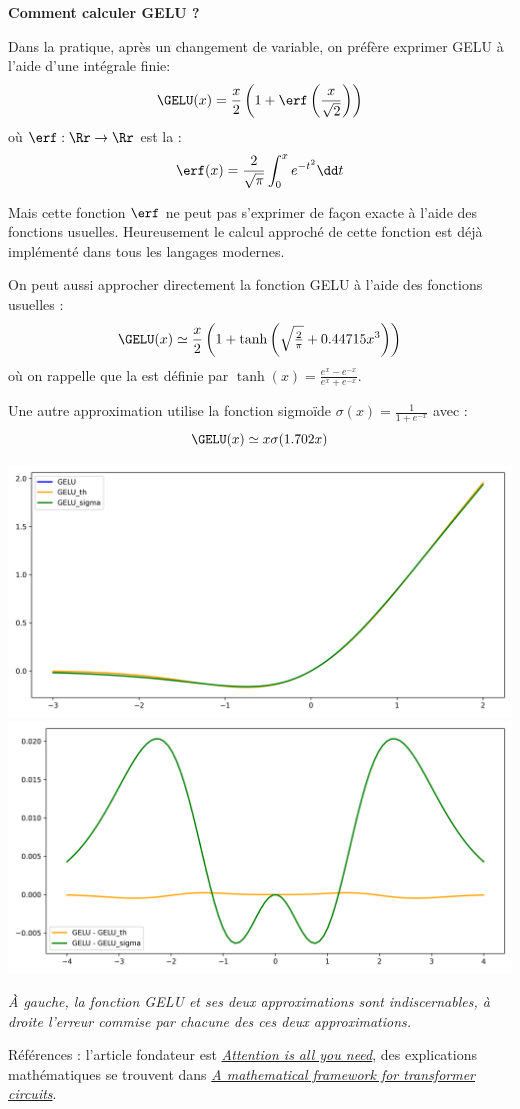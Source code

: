\documentclass[11pt,class=report,crop=false]{standalone}
\begin{document}
\bigskip

\textbf{Comment calculer GELU ?}

Dans la pratique, après un changement de variable, on préfère exprimer GELU à l'aide d'une intégrale finie:
$$\GELU(x) = \frac{x}{2} \left( 1 + \erf\left(\frac{x}{\sqrt{2}}\right) \right)$$
où $\erf : \Rr \to \Rr$ est la  :
$$\erf(x) = \frac{2}{\sqrt \pi} \int_0^x e^{-t^2} \dd t$$

Mais cette fonction $\erf$ ne peut pas s'exprimer de façon exacte à l'aide des fonctions usuelles. Heureusement le calcul approché de cette fonction est déjà implémenté dans tous les langages modernes.

On peut aussi approcher directement la fonction GELU à l'aide des fonctions usuelles :
$$\GELU(x) \simeq \frac{x}{2} \left( 1 + \tanh\left( \sqrt{\tfrac{2}{\pi}} + 0.44715 x^3 \right)\right)$$
où on rappelle que la  est définie par $\tanh(x) = \frac{e^x - e^{-x}}{e^x + e^{-x}}$.

Une autre approximation utilise la fonction sigmoïde $\sigma(x) = \frac{1}{1+e^{-x}}$ avec :
$$\GELU(x) \simeq x\sigma(1.702 x)$$


\begin{center}
	\includegraphics[scale=\myscale,scale=0.3]{figures/gelu05}\quad
	\includegraphics[scale=\myscale,scale=0.3]{figures/gelu06}	
	
	\emph{À gauche, la fonction GELU et ses deux approximations sont indiscernables, à droite l'erreur commise par chacune des ces deux approximations.}
\end{center}

\vfill

Références : l'article fondateur est 
\href{https://arxiv.org/pdf/1706.03762.pdf}{\emph{Attention is all you need}}, des explications mathématiques se trouvent dans
\href{https://transformer-circuits.pub/2021/framework/index.html}{\emph{A mathematical framework for transformer circuits}}.

\bigskip
\end{document}
